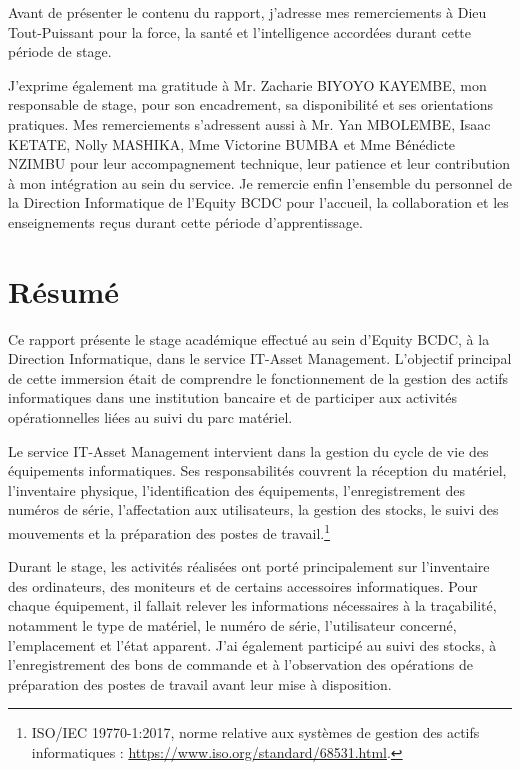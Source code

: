 \documentclass[12pt,a4paper]{report}
\begin{document}
Avant de présenter le contenu du rapport, j'adresse mes remerciements à Dieu Tout-Puissant pour la force, la santé et l'intelligence accordées durant cette période de stage.

J'exprime également ma gratitude à Mr. Zacharie BIYOYO KAYEMBE, mon responsable de stage, pour son encadrement, sa disponibilité et ses orientations pratiques. Mes remerciements s'adressent aussi à Mr. Yan MBOLEMBE, Isaac KETATE, Nolly MASHIKA, Mme Victorine BUMBA et Mme Bénédicte NZIMBU pour leur accompagnement technique, leur patience et leur contribution à mon intégration au sein du service.
Je remercie enfin l'ensemble du personnel de la Direction Informatique de l'Equity BCDC pour l'accueil, la collaboration et les enseignements reçus durant cette période d'apprentissage.

\chapter*{Résumé}

Ce rapport présente le stage académique effectué au sein d'Equity BCDC, à la Direction Informatique, dans le service IT-Asset Management. L'objectif principal de cette immersion était de comprendre le fonctionnement de la gestion des actifs informatiques dans une institution bancaire et de participer aux activités opérationnelles liées au suivi du parc matériel.

Le service IT-Asset Management intervient dans la gestion du cycle de vie des équipements informatiques. Ses responsabilités couvrent la réception du matériel, l'inventaire physique, l'identification des équipements, l'enregistrement des numéros de série, l'affectation aux utilisateurs, la gestion des stocks, le suivi des mouvements et la préparation des postes de travail.\footnote{ISO/IEC 19770-1:2017, norme relative aux systèmes de gestion des actifs informatiques : 
\url{https://www.iso.org/standard/68531.html}.}

Durant le stage, les activités réalisées ont porté principalement sur l'inventaire des ordinateurs, des moniteurs et de certains accessoires informatiques. Pour chaque équipement, il fallait relever les informations nécessaires à la traçabilité, notamment le type de matériel, le numéro de série, l'utilisateur concerné, l'emplacement et l'état apparent. J'ai également participé au suivi des stocks, à l'enregistrement des bons de commande et à l'observation des opérations de préparation des postes de travail avant leur mise à disposition.
\end{document}
